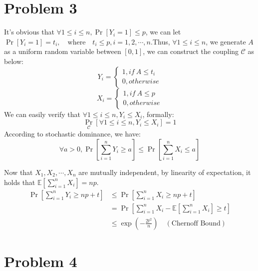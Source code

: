 \documentclass[a4paper, 12pt, titlepage]{article}
\begin{document}
\section{Problem 3}
It's obvious that $\forall 1 \leq i \leq n, \Pr \left[ Y_{i} = 1 \right] \leq p $, we can let $\Pr \left[ Y_{i} = 1 \right] = t_{i}, \quad \text{where} \quad t_{i} \leq p, i = 1, 2, \cdots, n$.Thus, $\forall 1 \leq i \leq n$, we generate $A$ as a uniform random variable between $\left[ 0, 1 \right]$, we can construct the
coupling $\mathcal{C}$ as below:
\[
    Y_{i} = \begin{cases}
        1, if \ A \leq t_{i} \\
        0, otherwise
    \end{cases}  
\]
\[
    X_{i} = \begin{cases}
        1, if \ A \leq p \\
        0, otherwise
    \end{cases}  
\]
We can easily verify that $\forall 1 \leq i \leq n, Y_{i} \leq X_{i}$, formally:
\[
    \Pr_{\mathcal{C}} \left[ \forall 1 \leq i \leq n, Y_{i} \leq X_{i} \right] = 1
\]
According to stochastic dominance, we have:
\[
    \forall a > 0, \Pr \left[ \sum_{i = 1}^{n} Y_{i} \geq a \right] \leq \Pr \left[ \sum_{i = 1}^{n} X_{i} \leq a \right] 
\]

Now that $X_{1}, X_{2}, \cdots, X_{n}$ are mutually independent, by linearity of expectation, it holds that $\mathbb E \left[ \sum_{i = 1}^{n} X_{i} \right] = np$.
\begin{equation}
    \begin{aligned}
        \Pr \left[ \sum_{i = 1}^{n} Y_{i} \geq np + t \right] &\leq  \Pr \left[ \sum_{i = 1}^{n} X_{i} \geq np + t \right] \\
                                                              &= \Pr \left[ \sum_{i = 1}^{n} X_{i} - \mathbb E \left[ \sum_{i = 1}^{n} X_{i} \right] \geq t \right] \\
                                                              &\leq \exp \left( - \frac{2 t^2}{n} \right) \quad (\text{Chernoff Bound})
    \end{aligned}
\end{equation}

\section{Problem 4}
\end{document}
